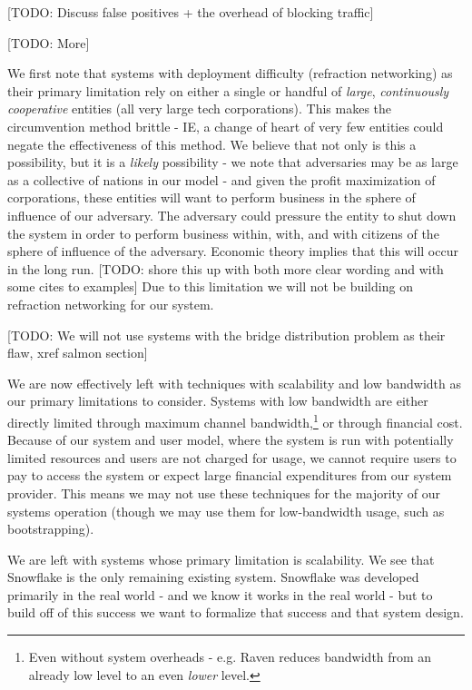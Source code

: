 \documentclass[12pt]{report}
\begin{document}
[TODO: Discuss false positives + the overhead of blocking traffic]

[TODO: More]

We first note that systems with deployment difficulty (refraction networking) as their primary limitation rely on either a single or handful of \emph{large}, \emph{continuously cooperative} entities (all very large tech corporations). This makes the circumvention method brittle - IE, a change of heart of very few entities could negate the effectiveness of this method. We believe that not only is this a possibility, but it is a \emph{likely} possibility - we note that adversaries may be as large as a collective of nations in our model - and given the profit maximization of corporations, these entities will want to perform business in the sphere of influence of our adversary. The adversary could pressure the entity to shut down the system in order to perform business within, with, and with citizens of the sphere of influence of the adversary. Economic theory implies that this will occur in the long run. [TODO: shore this up with both more clear wording and with some cites to examples] Due to this limitation we will not be building on refraction networking for our system.

[TODO: We will not use systems with the bridge distribution problem as their flaw, xref salmon section]

We are now effectively left with techniques with scalability and low bandwidth as our primary limitations to consider. Systems with low bandwidth are either directly limited through maximum channel bandwidth,\footnote{Even without system overheads - e.g. Raven reduces bandwidth from an already low level to an even \emph{lower} level.} or through financial cost. Because of our system and user model, where the system is run with potentially limited resources and users are not charged for usage, we cannot require users to pay to access the system or expect large financial expenditures from our system provider. This means we may not use these techniques for the majority of our systems operation (though we may use them for low-bandwidth usage, such as bootstrapping).

We are left with systems whose primary limitation is scalability. We see that Snowflake is the only remaining existing system. Snowflake was developed primarily in the real world - and we know it works in the real world - but to build off of this success we want to formalize that success and that system design.
\end{document}

